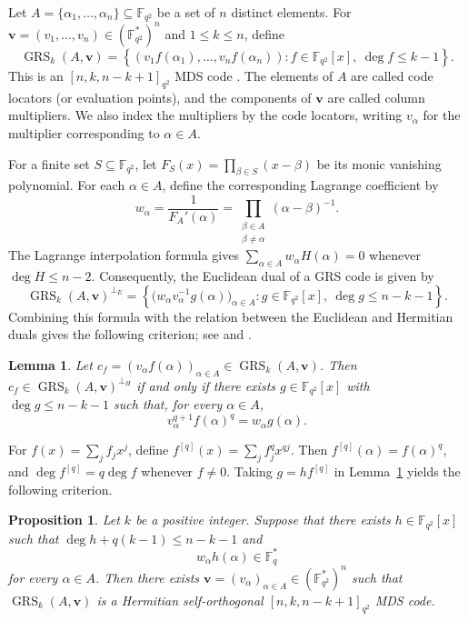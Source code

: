 \documentclass[preprint,12pt,a4paper]{elsarticle}
\newtheorem{lemma}[theorem]{Lemma}
\newtheorem{proposition}[theorem]{Proposition}
\newcommand{\GRS}{\operatorname{GRS}}
\begin{document}
Let $A=\{\alpha_1,\ldots,\alpha_n\}\subseteq\mathbb F_{q^2}$ be a set of $n$ distinct elements. For $\boldsymbol v=(v_1,\ldots,v_n)\in(\mathbb F_{q^2}^{*})^n$ and $1\le k\le n$, define
\[
 \GRS_k(A,\boldsymbol v)=\left\{(v_1f(\alpha_1),\ldots,v_nf(\alpha_n)):
 f\in\mathbb F_{q^2}[x],\ \deg f\le k-1\right\}.
\]
This is an \mbox{$[n,k,n-k+1]_{q^2}$} MDS code \cite{MacWilliamsSloane1977}. The elements of $A$ are called code locators (or evaluation points), and the components of $\boldsymbol v$ are called column multipliers. We also index the multipliers by the code locators, writing $v_\alpha$ for the multiplier corresponding to $\alpha\in A$.

For a finite set $S\subseteq\mathbb F_{q^2}$, let $F_S(x)=\prod_{\beta\in S}(x-\beta)$ be its monic vanishing polynomial. For each $\alpha\in A$, define the corresponding Lagrange coefficient by
\[
 w_\alpha=\frac{1}{F_A'(\alpha)}
 =\prod_{\substack{\beta\in A\\\beta\ne\alpha}}(\alpha-\beta)^{-1}.
\]
The Lagrange interpolation formula gives $\sum_{\alpha\in A}w_\alpha H(\alpha)=0$ whenever $\deg H\le n-2$. Consequently, the Euclidean dual of a GRS code is given by \cite{MacWilliamsSloane1977,FangFu2018}
\[
 \GRS_k(A,\boldsymbol v)^{\perp_E}
 =\left\{\bigl(w_\alpha v_\alpha^{-1}g(\alpha)\bigr)_{\alpha\in A}:
 g\in\mathbb F_{q^2}[x],\ \deg g\le n-k-1\right\}.
\]
Combining this formula with the relation between the Euclidean and Hermitian duals gives the following criterion; see \cite[Lemma~6]{FangFu2018} and \cite{WanZhengZhu2025}.

\begin{lemma}\label{lem:hermitian-dual}
Let $c_f=(v_\alpha f(\alpha))_{\alpha\in A}\in\GRS_k(A,\boldsymbol v)$. Then $c_f\in\GRS_k(A,\boldsymbol v)^{\perp_H}$ if and only if there exists $g\in\mathbb F_{q^2}[x]$ with $\deg g\le n-k-1$ such that, for every $\alpha\in A$,
\[
 v_\alpha^{q+1}f(\alpha)^q=w_\alpha g(\alpha).
\]
\end{lemma}


For $f(x)=\sum_j f_jx^j$, define $f^{[q]}(x)=\sum_j f_j^q x^{qj}$. Then $f^{[q]}(\alpha)=f(\alpha)^q$, and $\deg f^{[q]}=q\deg f$ whenever $f\ne0$. Taking $g=hf^{[q]}$ in Lemma~\ref{lem:hermitian-dual} yields the following criterion.

\begin{proposition}\label{prop:polynomial-criterion}
Let $k$ be a positive integer. Suppose that there exists $h\in\mathbb F_{q^2}[x]$ such that $\deg h+q(k-1)\le n-k-1$ and
\[
 w_\alpha h(\alpha)\in\mathbb F_q^{*}
\]
for every $\alpha\in A$. Then there exists $\boldsymbol v=(v_\alpha)_{\alpha\in A}\in (\mathbb F_{q^2}^{*})^n$
such that $\GRS_k(A,\boldsymbol v)$ is a Hermitian self-orthogonal \mbox{$[n,k,n-k+1]_{q^2}$} MDS code.
\end{proposition}
\end{document}
